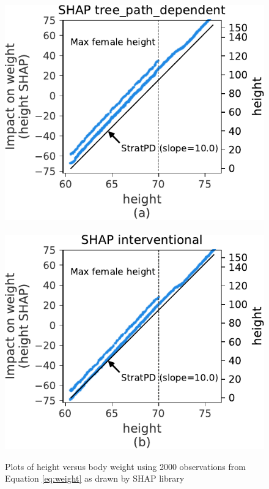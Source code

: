 \documentclass[twoside,11pt]{article}
\begin{document}
\begin{figure}[htbp]
\begin{center}
\includegraphics[scale=0.7]{images/weight-shap-tree_path_dependent.pdf}~~
\includegraphics[scale=0.7]{images/weight-shap-interventional.pdf}
\caption{Plots of height versus body weight using 2000 observations from Equation \eqref{eq:weight} as drawn by SHAP library}
\label{fig:shap-weight}
\end{center}
\end{figure}
\end{document}
